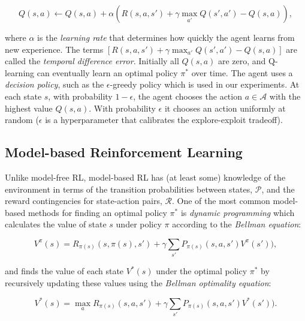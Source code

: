 \documentclass[letterpaper]{article}
\begin{document}
\begin{small}
\begin{equation}
Q(s,a) \leftarrow Q(s,a) + \alpha (R(s,a,s') + \gamma \max_{a'} Q(s', a') - Q(s,a)),
\end{equation}
\end{small}

\noindent
where $\alpha$ is the \textit{learning rate} that determines how quickly the agent learns from new experience. The terms $[R(s,a,s') + \gamma \max_{a'} Q(s', a') - Q(s,a)]$ are called the \textit{temporal difference error}. Initially all $Q(s,a)$ are zero, and Q-learning can eventually learn an optimal policy $\pi^*$ over time. The agent uses a \textit{decision policy}, such as the $\epsilon$-greedy policy which is used in our experiments. At each state $s$, with probability $1 - \epsilon$, the agent chooses the action $a \in \mathcal{A}$ with the highest value $Q(s,a)$. With probability $\epsilon$ it chooses an action uniformly at random ($\epsilon$ is a hyperparameter that calibrates the explore-exploit tradeoff).
 
\subsection{Model-based Reinforcement Learning}

Unlike model-free RL, model-based RL has (at least some) knowledge of the environment in terms of the transition probabilities between states, $\mathcal{P}$, and the reward contingencies for state-action pairs, $\mathcal{R}$. One of the most common model-based methods for finding an optimal policy $\pi^*$ is \textit{dynamic programming} which calculates the value of state $s$ under policy $\pi$ according to the \textit{Bellman equation}:

\begin{small}
\begin{equation}
V^{\pi}(s) = R_{\pi(s)}(s,\pi(s),s') + \gamma \sum\limits_{s'} P_{\pi(s)}(s,a,s')V^{\pi}(s')),
\end{equation}
\end{small}

\noindent
and finds the value of each state $V^{*}(s)$ under the optimal policy $\pi^*$ by recursively updating these values using the \textit{Bellman optimality equation}:

\begin{small}
\begin{equation}
V^{*}(s) = \max_a R_{\pi(s)}(s,a,s') + \gamma \sum\limits_{s'} P_{\pi(s)}(s,a,s')V^{*}(s')).
\end{equation}
\end{small}
\end{document}

